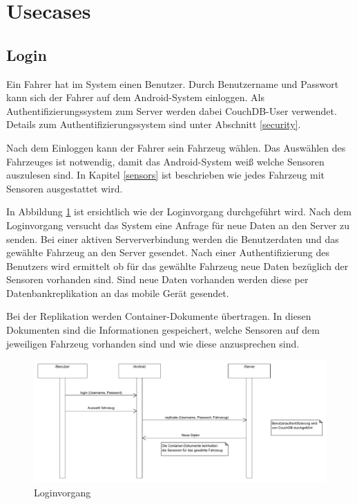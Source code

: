 \section{Usecases}

\subsection{Login}

Ein Fahrer hat im System einen Benutzer. Durch Benutzername und Passwort kann sich der Fahrer auf dem Android-System einloggen. Als Authentifizierungssystem zum Server werden dabei CouchDB-User verwendet. Details zum Authentifizierungssystem sind unter Abschnitt \ref{security}.

Nach dem Einloggen kann der Fahrer sein Fahrzeug wählen. Das Auswählen des Fahrzeuges ist notwendig, damit das Android-System weiß welche Sensoren auszulesen sind. In Kapitel \ref{sensors} ist beschrieben wie jedes Fahrzeug mit Sensoren ausgestattet wird. 

In Abbildung \ref{fig:login} ist ersichtlich wie der Loginvorgang durchgeführt wird. Nach dem Loginvorgang versucht das System eine Anfrage für neue Daten an den Server zu senden.  Bei einer aktiven Serververbindung werden die Benutzerdaten und das gewählte Fahrzeug an den Server gesendet. Nach einer Authentifizierung des Benutzers wird ermittelt ob für das gewählte Fahrzeug neue Daten bezüglich der Sensoren vorhanden sind. Sind neue Daten vorhanden werden diese per Datenbankreplikation an das mobile Gerät gesendet.

Bei der Replikation werden Container-Dokumente übertragen. In diesen Dokumenten sind die Informationen gespeichert, welche Sensoren auf dem jeweiligen Fahrzeug vorhanden sind und wie diese anzusprechen sind.

\begin{figure}
	\centering
		\includegraphics[width=\textwidth]{files/pdf/Login.pdf}
	\caption{Loginvorgang}
	\label{fig:login}
\end{figure}


